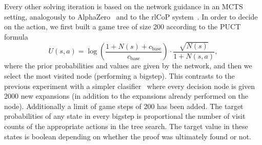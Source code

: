 \documentclass{ecai}
\def\systemname#1{\textsf{#1}\xspace}
\newcommand{\rlc}{\systemname{rlCoP}}
\begin{document}
Every other solving iteration is based on the network guidance in an
MCTS setting, analogously to AlphaZero~\cite{silver2017mastering} and
to the \rlc system~\cite{KaliszykUMO18}. In order to decide
on the action, we first built a game tree of size 200 according to the PUCT formula
$$
U(s,a) = \log\left(\frac{1+N(s)+c_{\mathrm{base}}}{c_{\mathrm{base}}}\right)\cdot\frac{\sqrt{N(s)}}{1+N(s,a)},
$$
where the prior probabilities and values are given by the network, and
then we select the most visited node (performing a bigstep). This contrasts to the previous
experiment with a simpler clasifier~\cite{KaliszykUMO18} where
every decision node is given 2000 new expansions (in addition to the
expansions already performed on the node).
Additionally a limit of game steps of 200 has been added.
The target probabilities of any state in every bigstep is proportional
the number of visit counts of the appropriate actions in the tree
search. The target value in these states is boolean depending on
whether the proof was ultimately found or not.

%
%
\end{document}

